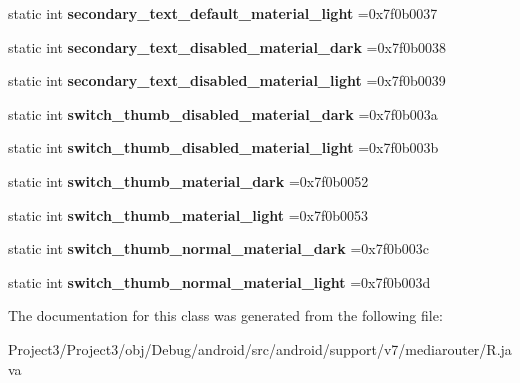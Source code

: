 \begin{DoxyCompactItemize}
static int {\bfseries secondary\+\_\+text\+\_\+default\+\_\+material\+\_\+light} =0x7f0b0037
\item 
\mbox{\label{classandroid_1_1support_1_1v7_1_1mediarouter_1_1R_1_1color_a7a14d1fe72f27edbfcb21cc7879d4314}} 
static int {\bfseries secondary\+\_\+text\+\_\+disabled\+\_\+material\+\_\+dark} =0x7f0b0038
\item 
\mbox{\label{classandroid_1_1support_1_1v7_1_1mediarouter_1_1R_1_1color_abca45f0e4204a6ea2035c44407496bb4}} 
static int {\bfseries secondary\+\_\+text\+\_\+disabled\+\_\+material\+\_\+light} =0x7f0b0039
\item 
\mbox{\label{classandroid_1_1support_1_1v7_1_1mediarouter_1_1R_1_1color_aa6e77f795efc7b455db7a334e42a598a}} 
static int {\bfseries switch\+\_\+thumb\+\_\+disabled\+\_\+material\+\_\+dark} =0x7f0b003a
\item 
\mbox{\label{classandroid_1_1support_1_1v7_1_1mediarouter_1_1R_1_1color_a0aa41522de33b544cf41d58358683769}} 
static int {\bfseries switch\+\_\+thumb\+\_\+disabled\+\_\+material\+\_\+light} =0x7f0b003b
\item 
\mbox{\label{classandroid_1_1support_1_1v7_1_1mediarouter_1_1R_1_1color_a13bce789a3bb8cbc58131c943b4b2e83}} 
static int {\bfseries switch\+\_\+thumb\+\_\+material\+\_\+dark} =0x7f0b0052
\item 
\mbox{\label{classandroid_1_1support_1_1v7_1_1mediarouter_1_1R_1_1color_abf22d3c503667d6bc1aacfbccb34cc61}} 
static int {\bfseries switch\+\_\+thumb\+\_\+material\+\_\+light} =0x7f0b0053
\item 
\mbox{\label{classandroid_1_1support_1_1v7_1_1mediarouter_1_1R_1_1color_a19d27c5506f194602b9fce90d523636c}} 
static int {\bfseries switch\+\_\+thumb\+\_\+normal\+\_\+material\+\_\+dark} =0x7f0b003c
\item 
\mbox{\label{classandroid_1_1support_1_1v7_1_1mediarouter_1_1R_1_1color_a40da58d1c31e301abba5062ca4828157}} 
static int {\bfseries switch\+\_\+thumb\+\_\+normal\+\_\+material\+\_\+light} =0x7f0b003d
\end{DoxyCompactItemize}


The documentation for this class was generated from the following file\+:\begin{DoxyCompactItemize}
\item 
Project3/\+Project3/obj/\+Debug/android/src/android/support/v7/mediarouter/R.\+java\end{DoxyCompactItemize}
